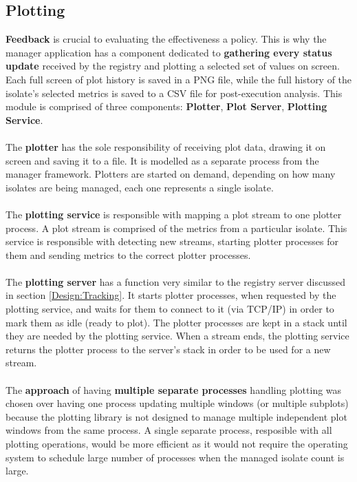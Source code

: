 \documentclass{l4proj}
\begin{document}
\subsection{Plotting}
\hspace*{1em} \textbf{Feedback} is crucial to evaluating the effectiveness a policy. This is why the manager application has a component dedicated to \textbf{gathering every status update} received by the registry and plotting a selected set of values on screen. Each full screen of plot history is saved in a PNG file, while the full history of the isolate's selected metrics is saved to a CSV file for post-execution analysis. This module is comprised of three components: \textbf{Plotter}, \textbf{Plot Server}, \textbf{Plotting Service}.
\\\\
\hspace*{1em}  The \textbf{plotter} has the sole responsibility of receiving plot data, drawing it on screen and saving it to a file. It is modelled as a separate process from the manager framework. Plotters are started on demand, depending on how many isolates are being managed, each one represents a single isolate. 
\\\\
\hspace*{1em}  The \textbf{plotting service} is responsible with mapping a plot stream to one plotter process. A plot stream is comprised of the metrics from a particular isolate. This service is responsible with detecting new streams, starting plotter processes for them and sending metrics to the correct plotter processes.
\\\\
\hspace*{1em} The \textbf{plotting server} has a function very similar to the registry server discussed in section \ref{Design:Tracking}. It starts plotter processes, when requested by the plotting service, and waits for them to connect to it (via TCP/IP) in order to mark them as idle (ready to plot). The plotter processes are kept in a stack until they are needed by the plotting service. When a stream ends, the plotting service returns the plotter process to the server's stack in order to be used for a new stream.
\\\\
\hspace*{1em} The \textbf{approach} of having \textbf{multiple separate processes} handling plotting was chosen over having one process updating multiple windows (or multiple subplots) because the plotting library is not designed to manage multiple independent plot windows from the same process. A single separate process, resposible with all plotting operations, would be more efficient as it would not require the operating system to schedule large number of processes when the managed isolate count is large. 
\end{document}
